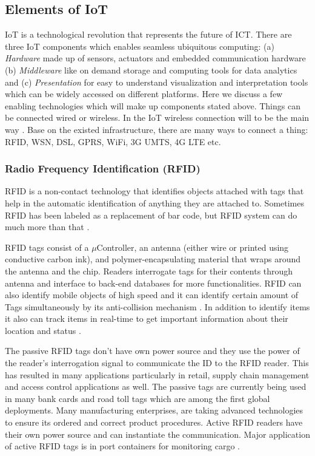 \subsection{Elements of IoT}
\acs{IoT} is a technological revolution that represents the future of \acs{ICT}. There are three \acs{IoT} components which enables seamless ubiquitous computing: (a) \textit{Hardware} made up of sensors, actuators and embedded communication hardware (b) \textit{Middleware} like on demand storage and computing tools for data analytics and (c) \textit{Presentation} for easy to understand visualization and interpretation tools which can be widely accessed on different platforms. Here we discuss a few enabling technologies which will make up components stated above. Things can be connected wired or wireless. In the \acs{IoT} wireless connection will to be the main way \cite{IOTGUBBI,IOTFUTURE}. Base on the existed infrastructure, there are many ways to connect a thing: \acs{RFID}, \acs{WSN}, \acs{DSL}, \acs{GPRS}, WiFi, 3G \acs{UMTS}, 4G \acs{LTE} etc.
\subsubsection{Radio Frequency Identification (RFID)}
\acs{RFID} is a non-contact technology that identifies objects attached with tags that help in the automatic identification of anything they are attached to. Sometimes \acs{RFID} has been labeled as a replacement of bar code, but \acs{RFID} system can do much more than that \cite{RFIDMIS,IOTFUTURE}.

\acs{RFID} tags consist of a $\mu$Controller, an antenna (either wire or printed using conductive carbon ink), and polymer-encapsulating material that wraps around the antenna and the chip. Readers interrogate tags for their contents through antenna and interface to back-end databases for more functionalities. \acs{RFID} can also identify mobile objects of high speed and it can identify certain amount of Tags simultaneously by its anti-collision mechanism \cite{RFIDMIS}. In addition to identify items it also can track items in real-time to get important information about their location and status \cite{IOTFUTURE}. 

The passive \acs{RFID} tags don't have  own power source and they use the power of the reader’s interrogation signal to communicate the ID to the \acs{RFID} reader. This has resulted in many applications particularly in retail, supply chain management and access control applications as well. The passive tags are currently being used in many bank cards and road toll tags which are among the first global deployments. Many
manufacturing enterprises, are taking advanced technologies to ensure its ordered and correct product procedures. Active \acs{RFID} readers have their own power source and can instantiate the communication. Major application of active \acs{RFID} tags is in port containers for monitoring cargo \cite{IOTGUBBI,RFIDMIS}.

